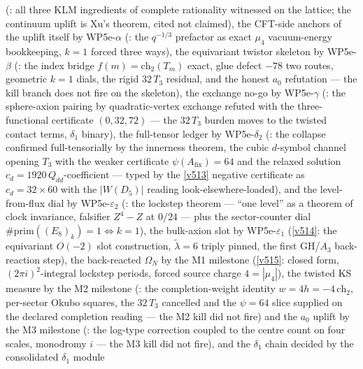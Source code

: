 (: all three KLM ingredients of complete
rationality witnessed on the lattice; the continuum uplift is Xu's theorem, cited not claimed),
the CFT-side anchors of the uplift itself by WP5e-$\alpha$
(: the $q^{-1/3}$ prefactor as exact $\mu_4$
vacuum-energy bookkeeping, $k=1$ forced three ways), the equivariant twistor skeleton by
WP5e-$\beta$ (: the index bridge
$f(m)=\mathrm{ch}_2(T_m)$ exact, glue defect $-78$ two routes, geometric $k=1$ dials, the rigid
$32\,T_3$ residual, and the honest $a_0$ refutation --- the kill branch does not fire on the
skeleton), the exchange no-go by WP5e-$\gamma$
(: the sphere-axion pairing by quadratic-vertex
exchange refuted with the three-functional certificate $(0,32,72)$ --- the $32\,T_3$ burden moves
to the twisted contact terms, $\delta_1$ binary), the full-tensor ledger by WP5e-$\delta_2$
(: the collapse confirmed full-tensorially
by the innerness theorem, the cubic $d$-symbol channel opening $T_3$ with the weaker certificate
$\psi(A_{\mathrm{fix}})=64$ and the relaxed solution $c_d=1920\,Q_{dd}$-coefficient --- typed by
the \vref{v513} negative certificate as $c_d=32\times60$ with the $|W(D_5)|$ reading
look-elsewhere-loaded), and the
level-from-flux dial by
WP5e-$\varepsilon_2$ (: the lockstep
theorem --- ``one level'' as a theorem of clock invariance, falsifier $Z^4{-}Z$ at $0/24$ ---
plus the sector-counter dial $\#\mathrm{prim}((E_8)_k)=1\Leftrightarrow k=1$), the bulk-axion
slot by WP5e-$\varepsilon_1$ (\vref{v514}: the equivariant $O(-2)$ slot construction,
$\tilde\lambda=6$ triply pinned, the first GH/$A_3$ back-reaction step), the back-reacted
$\Omega_N$ by the M1 milestone (\vref{v515}: closed form, $(2\pi i)^2$-integral lockstep
periods, forced source charge $4=|\mu_4|$), the twisted KS measure by the M2 milestone
(: the completion-weight identity
$w=4h=-4\,\mathrm{ch}_2$, per-sector Okubo squares, the $32\,T_3$ cancelled and the $\psi=64$
slice supplied on the declared completion reading --- the M2 kill did not fire) and the $a_0$
uplift by the M3 milestone (: the log-type
correction coupled to the centre count on four scales, monodromy $i$ --- the M3 kill did not
fire), and the $\delta_1$ chain decided by the consolidated $\delta_1$ module
